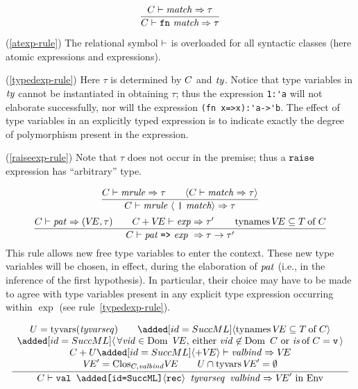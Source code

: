 \begin{equation}        %
\frac{\C\ts\match\ra\tau}
     {\C\ts\fnexp\ra\tau}
\end{equation}
\comments
\begin{description}
\item{(\ref{atexp-rule})}
The relational symbol $\vdash$ is overloaded for all syntactic classes (here
atomic expressions and expressions).
\item{(\ref{typedexp-rule})}
Here $\tau$ is determined by $C$ and ${\it ty}$. Notice that type variables
in ${\it ty}$ cannot be instantiated in obtaining $\tau$; thus the expression
\verb+1:'a+ will not elaborate successfully, nor will the expression
\verb+(fn x=>x):'a->'b+.
The effect of type variables in an explicitly typed expression is
to indicate exactly the degree of polymorphism present in the expression.
\item{(\ref{raiseexp-rule})}
Note that $\tau$ does not occur in the premise; thus a ${\tt raise}$
expression has ``arbitrary'' type.
\end{description}
%
\begin{equation}        %
\frac{\C\ts\mrule\ra\tau\qquad\langle\C\ts\match\ra\tau\rangle}
     {\C\ts\longmatch\ra\tau}\index{28.1}
\end{equation}
\begin{equation}        %
\label{mrule-rule}
\frac{\C\ts\pat\ra(\VE,\tau)\qquad\C+\VE\ts\exp\ra\tau'\qquad\TyNamesFcn\VE\subseteq\of{\T}{\C}}
     {\C\ts\longmrule\ \ra\tau\rightarrow\tau'}
\end{equation}%
\comment  This rule allows new free type variables to enter
the context. These new type variables will be chosen, in effect, during
the elaboration of ${\it pat}$ (i.e., in the inference of the first
hypothesis). In particular, their choice may have to be made to
agree with type variables present in any explicit type expression
occurring within $\exp$ (see rule~\ref{typedexp-rule}).

%
%
\begin{equation}        %
\label{valdec-rule}
\frac{\begin{array}{c}
      U = \TyVarsFcn (\tyvarseq) \qquad \ADD{\langle \TyNamesFcn\VE\subseteq\of{\T}{\C} \rangle} \\
      \ADD{\langle\,\forall\vid\in\Dom\ \VE,\,\mbox{either $\vid\not\in\Dom\ C$ or $\of{\is}{\C} = \isv$}\,\rangle} \\
     \plusmap{\C}{\U}\ADD{\langle+\VE\rangle}\ts\valbind\ra\VE \\ 
      \VE'=\cl{\C,\valbind}{\VE}\qquad
      \U\cap\TyVarFcn\VE'=\emptyset
      \end{array}}
     {\C\ts\boxml{val \ADD{$\langle$rec$\rangle$} $\tyvarseq$ $\valbind$}\ra\VE'\ \In\ \Env}\index{28.2}
\end{equation}

